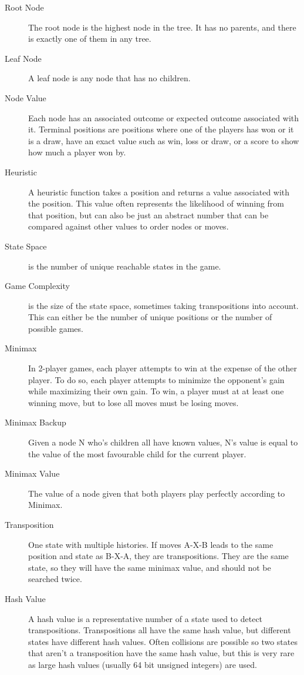 \begin{description}
\item[Root Node] The root node is the highest node in the tree. It has no parents, and there is exactly one of them in any tree.
\item[Leaf Node] A leaf node is any node that has no children.
\item[Node Value] Each node has an associated outcome or expected outcome associated with it. Terminal positions are positions where one of the players has won or it is a draw, have an exact value such as win, loss or draw, or a score to show how much a player won by.
\item[Heuristic] A heuristic function takes a position and returns a value associated with the position. This value often represents the likelihood of winning from that position, but can also be just an abstract number that can be compared against other values to order nodes or moves.
\item[State Space] is the number of unique reachable states in the game.
\item[Game Complexity] is the size of the state space, sometimes taking transpositions into account. This can either be the number of unique positions or the number of possible games.
\item[Minimax] In 2-player games, each player attempts to win at the expense of the other player. To do so, each player attempts to minimize the opponent's gain while maximizing their own gain. To win, a player must at at least one winning move, but to lose all moves must be losing moves.
\item[Minimax Backup] Given a node N who's children all have known values, N's value is equal to the value of the most favourable child for the current player.
\item[Minimax Value] The value of a node given that both players play perfectly according to Minimax.
\item[Transposition] One state with multiple histories. If moves A-X-B leads to the same position and state as B-X-A, they are transpositions. They are the same state, so they will have the same minimax value, and should not be searched twice.
\item[Hash Value] A hash value is a representative number of a state used to detect transpositions. Transpositions all have the same hash value, but different states have different hash values. Often collisions are possible so two states that aren't a transposition have the same hash value, but this is very rare as large hash values (usually 64 bit unsigned integers) are used.

\end{description}
